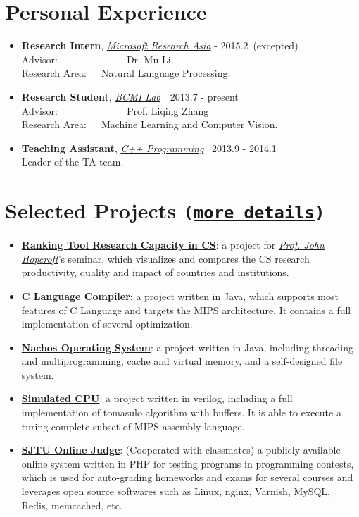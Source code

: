 \documentclass[letterpaper]{article}
\begin{document}
\section*{Personal Experience}
\begin{itemize}
\item \textbf{Research Intern}, \emph{\href{http://research.microsoft.com/en-us/labs/asia/}{Microsoft Research Asia}}  - 2015.2~(excepted)\\
    Advisor:~~~~~~~~~~~~~~{Dr. Mu Li}\\
    Research Area:~~~Natural Language Processing.
\item \textbf{Research Student}, \emph{\href{http://bcmi.sjtu.edu.cn}{BCMI Lab}}\qquad\qquad\qquad~~2013.7 - present\\
    Advisor:~~~~~~~~~~~~~~{\href{http://bcmi.sjtu.edu.cn/~zhangliqing/}{Prof. Liqing Zhang}}\\
    Research Area:~~~Machine Learning and Computer Vision.
\item \textbf{Teaching Assistant},  \emph{\href{http://acm.sjtu.edu.cn/wiki/Programming_2013}{C++ Programming}}\qquad~ 2013.9 - 2014.1\\
Leader of the TA team.
\end{itemize}

\section*{Selected Projects \normalsize{\tt(\href{https://github.com/lostleaf?tab=repositories}{more details})}}
\begin{itemize}
\item \textbf{\href{http://acm.sjtu.edu.cn/ricsrt/}{Ranking Tool Research Capacity in CS}}:
a project for \emph{\href{http://www.cs.cornell.edu/jeh/}{Prof. John Hopcroft}}'s seminar, which visualizes and compares the CS research productivity, quality and impact of countries and institutions.
\item \textbf{\href{https://github.com/lostleaf/compiler}{C Language Compiler}}:
a project written in Java, which supports most features of C Language and targets the MIPS architecture. It contains a full implementation of several optimization.
\item \textbf{\href{https://github.com/lostleaf/nachos}{Nachos Operating System}}: 
a project written in Java, including threading and multiprogramming, cache and virtual memory, and a self-designed file system.
\item \textbf{\href{https://github.com/lostleaf/cpu}{Simulated CPU}}:
a project written in verilog, including a full implementation of tomasulo algorithm with buffers. It is able to execute a turing complete subset of MIPS assembly language.
\item \textbf{\href{http://acm.sjtu.edu.cn/OnlineJudge/}{SJTU Online Judge}}: (Cooperated with classmates) a publicly available online system written in PHP for testing programs in programming contests, which is used for auto-grading homeworks and exams for several courses and leverages open source softwares such as Linux, nginx, Varnish, MySQL, Redis, memcached, etc.
\end{itemize}
\end{document}

